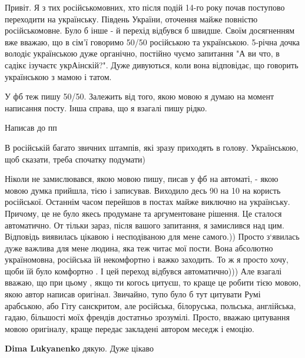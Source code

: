 \begin{itemize}

Привіт. Я з тих російськомовних, хто після подій 14-го року почав поступово
переходити на українську. Південь України, оточення майже повністю
російськомовне. Було б інше - й перехід відбувся б швидше. Своїм досягненням
вже вважаю, що в сім'ї говоримо 50/50 російською та українською. 5-річна дочка
володіє українською дуже органічно, постійно чуємо запитання "А ви что, в
садікє ізучаєтє укрАінскій?". Дуже дивуються, коли вона відповідає, що говорить
українською з мамою і татом.

У фб теж пишу 50/50. Залежить від того, якою мовою я думаю на момент написання
посту. Інша справа, що я взагалі пишу рідко.


Написав до пп


В російській багато звичних штампів, які зразу приходять в голову. Українською,
щоб сказати, треба спочатку подумати)


Ніколи не замислювався, якою мовою пишу, писав у фб на автоматі, - якою мовою
думка прийшла, тією і записував. Виходило десь 90 на 10 на користь російської.
Останнім часом перейшов в постах майже виключно на українську. Причому, це не
було якесь продумане та аргументоване рішення. Це сталося автоматично. От
тільки зараз, після вашого запитання, я замислився над цим. Відповідь виявилась
цікавою і несподіваною для мене самого.)) Просто з‘явилась дуже важлива для
мене людина, яка теж читає мої пости. Вона абсолютно україномовна, російська їй
некомфортно і важко заходить. То ж я просто хочу, щоби їй було комфортно . І
цей переход відбувся автоматично))) Але взагалі вважаю, що при цьому , якщо ти
когось цитуєш, то краще це робити тією мовою, якою автор написав оригінал.
Звичайно, тупо було б тут цитувати Румі арабською, або Гіту санскритом, але
російська, білоруська, польська, англійська, гадаю, більшості моїх френдів
достатньо зрозумілі. Просто, вважаю цитування мовою оригіналу, краще передає
закладені автором меседж і емоцію.

\begin{itemize} %
\textbf{Dima Lukyanenko} дякую. Дуже цікаво
\end{itemize} %

\end{itemize} %

